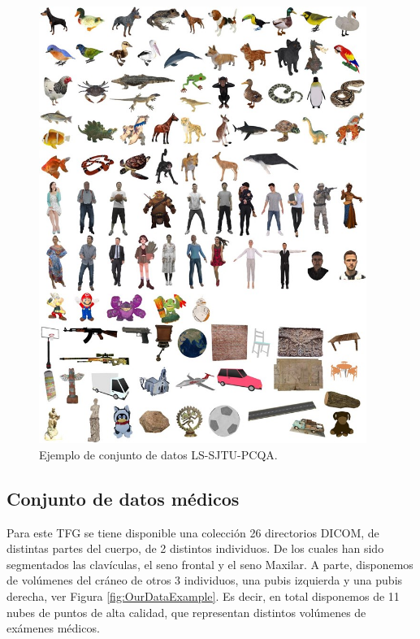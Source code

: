 \begin{figure}
  \begin{center}
    \includegraphics[width=0.95\textwidth]{imagenes/chapter4/LSPCQA}
  \end{center}
  \caption{Ejemplo de conjunto de datos LS-SJTU-PCQA\cite{ResSCNN}.}
  \label{fig:LS-SJTU-PCQA}
\end{figure}

\subsection{Conjunto de datos médicos}
\label{sec:OurData}
Para este TFG se tiene disponible una colección 26 directorios DICOM, de distintas
partes del cuerpo, de 2 distintos individuos. 
De los cuales han sido segmentados las clavículas, el seno frontal y el seno Maxilar. 
A parte, disponemos de volúmenes del cráneo de otros 3 individuos, una pubis izquierda y
una pubis derecha, ver Figura \ref{fig:OurDataExample}. Es decir, en total disponemos de 11 nubes de puntos de alta 
calidad, que representan distintos volúmenes de exámenes médicos.

